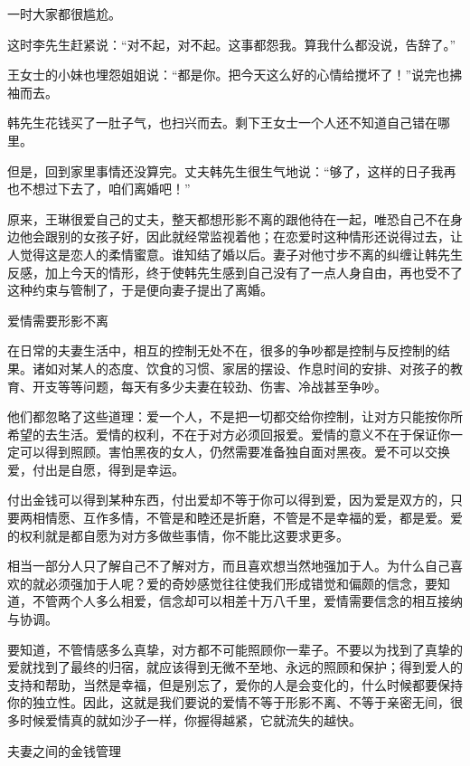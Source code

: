 \documentclass[12pt,UTF8,openany]{ctexbook}
\begin{document}
一时大家都很尴尬。

这时李先生赶紧说：“对不起，对不起。这事都怨我。算我什么都没说，告辞了。”

王女士的小妹也埋怨姐姐说：“都是你。把今天这么好的心情给搅坏了！”说完也拂袖而去。

韩先生花钱买了一肚子气，也扫兴而去。剩下王女士一个人还不知道自己错在哪里。

但是，回到家里事情还没算完。丈夫韩先生很生气地说：“够了，这样的日子我再也不想过下去了，咱们离婚吧！”

原来，王琳很爱自己的丈夫，整天都想形影不离的跟他待在一起，唯恐自己不在身边他会跟别的女孩子好，因此就经常监视着他；在恋爱时这种情形还说得过去，让人觉得这是恋人的柔情蜜意。谁知结了婚以后。妻子对他寸步不离的纠缠让韩先生反感，加上今天的情形，终于使韩先生感到自己没有了一点人身自由，再也受不了这种约束与管制了，于是便向妻子提出了离婚。





爱情需要形影不离


在日常的夫妻生活中，相互的控制无处不在，很多的争吵都是控制与反控制的结果。诸如对某人的态度、饮食的习惯、家居的摆设、作息时间的安排、对孩子的教育、开支等等问题，每天有多少夫妻在较劲、伤害、冷战甚至争吵。

他们都忽略了这些道理：爱一个人，不是把一切都交给你控制，让对方只能按你所希望的去生活。爱情的权利，不在于对方必须回报爱。爱情的意义不在于保证你一定可以得到照顾。害怕黑夜的女人，仍然需要准备独自面对黑夜。爱不可以交换爱，付出是自愿，得到是幸运。

付出金钱可以得到某种东西，付出爱却不等于你可以得到爱，因为爱是双方的，只要两相情愿、互作多情，不管是和睦还是折磨，不管是不是幸福的爱，都是爱。爱的权利就是都自愿为对方多做些事情，你不能比这要求更多。

相当一部分人只了解自己不了解对方，而且喜欢想当然地强加于人。为什么自己喜欢的就必须强加于人呢？爱的奇妙感觉往往使我们形成错觉和偏颇的信念，要知道，不管两个人多么相爱，信念却可以相差十万八千里，爱情需要信念的相互接纳与协调。

要知道，不管情感多么真挚，对方都不可能照顾你一辈子。不要以为找到了真挚的爱就找到了最终的归宿，就应该得到无微不至地、永远的照顾和保护；得到爱人的支持和帮助，当然是幸福，但是别忘了，爱你的人是会变化的，什么时候都要保持你的独立性。因此，这就是我们要说的爱情不等于形影不离、不等于亲密无间，很多时候爱情真的就如沙子一样，你握得越紧，它就流失的越快。





夫妻之间的金钱管理
\end{document}
